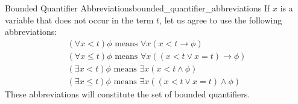 \begin{definition}{Bounded Quantifier Abbreviations}{bounded_quantifier_abbreviations}
If $x$ is a variable that does not occur in the term $t$, let us agree to use the following abbreviations:
\begin{gather*}
(\forall x<t) \phi \text { means } \forall x(x<t \rightarrow \phi) \\
(\forall x \leq t) \phi \text { means } \forall x((x<t \vee x=t) \rightarrow \phi) \\
(\exists x<t) \phi \text { means } \exists x(x<t \wedge \phi) \\
(\exists x \leq t) \phi \text { means } \exists x((x<t \vee x=t) \wedge \phi)
\end{gather*}
These abbreviations will constitute the set of bounded quantifiers.
\end{definition}
